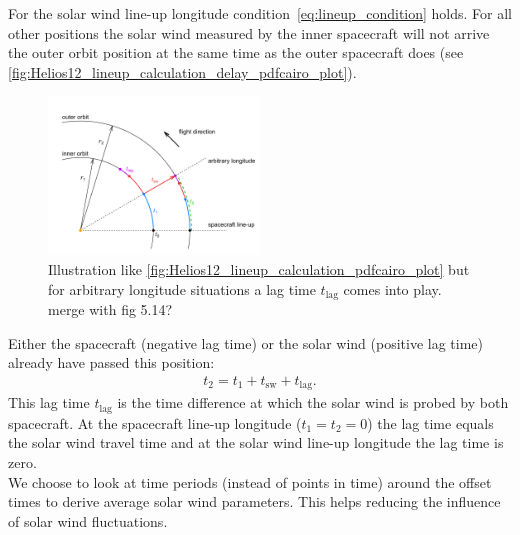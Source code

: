 For the solar wind line-up longitude condition~\eqref{eq:lineup_condition} holds. For all other positions the solar wind measured by the inner spacecraft will not arrive the outer orbit position at the same time as the outer spacecraft does (see \autoref{fig:Helios12_lineup_calculation_delay_pdfcairo_plot}).
\begin{figure}[htb]
	\centering
	\includegraphics[width=0.5\textwidth]{images/gnuplots/Helios12_lineup_calculation_delay_pdfcairo_plot.pdf}
	\caption{Illustration like \autoref{fig:Helios12_lineup_calculation_pdfcairo_plot} but for arbitrary longitude situations a lag time $t_\text{lag}$ comes into play. merge with fig 5.14?}
	\label{fig:Helios12_lineup_calculation_delay_pdfcairo_plot}
\end{figure}

Either the spacecraft (negative lag time) or the solar wind (positive lag time) already have passed this position:
\begin{align}
	t_2 = t_1 + t_\text{sw} + t_\text{lag}. \label{eq:lag_time}
\end{align}
This lag time $t_\text{lag}$ is the time difference at which the solar wind is probed by both spacecraft. At the spacecraft line-up longitude ($t_1 = t_2 = 0$) the lag time equals the solar wind travel time and at the solar wind line-up longitude the lag time is zero.\\

We choose to look at time periods (instead of points in time) around the offset times to derive average solar wind parameters. This helps reducing the influence of solar wind fluctuations.\\

